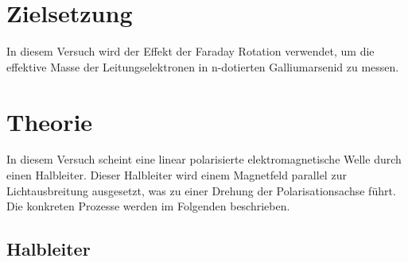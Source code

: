 \section{Zielsetzung}
In diesem Versuch wird der Effekt der Faraday Rotation verwendet, um die
effektive Masse der Leitungselektronen in n-dotierten Galliumarsenid zu messen.

\section{Theorie}
In diesem Versuch scheint eine linear polarisierte elektromagnetische Welle
durch einen Halbleiter. Dieser Halbleiter wird einem Magnetfeld parallel zur
Lichtausbreitung ausgesetzt, was zu einer Drehung der Polarisationsachse führt.
Die konkreten Prozesse werden im Folgenden beschrieben.

\subsection{Halbleiter \cite[][Kap. 13, 14]{book:expi3}}

